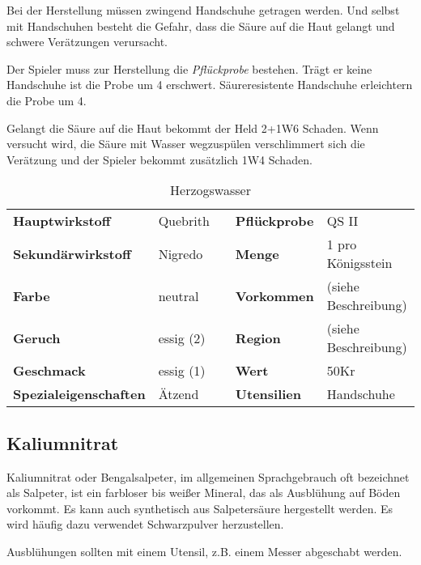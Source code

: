 Bei der Herstellung müssen zwingend Handschuhe getragen werden. Und selbst mit Handschuhen besteht die Gefahr, dass die Säure auf die Haut gelangt und schwere Verätzungen verursacht. 

Der Spieler muss zur Herstellung die \textit{Pflückprobe} bestehen. Trägt er keine Handschuhe ist die Probe um 4 erschwert. Säureresistente Handschuhe erleichtern die Probe um 4. 

Gelangt die Säure auf die Haut bekommt der Held 2+1W6 Schaden. Wenn versucht wird, die Säure mit Wasser wegzuspülen verschlimmert sich die Verätzung und der Spieler bekommt zusätzlich 1W4 Schaden.

\begin{table}[H] 
\begin{center} 
\begin{tabular}{|l|l|p{1cm}|l|l|} 
  	\cline{1-2} \cline{4-5} 
  	\textbf{Hauptwirkstoff} & Quebrith && \textbf{Pflückprobe} & QS II \\ \cline{1-2} \cline{4-5} 
  	\textbf{Sekundärwirkstoff} & Nigredo && \textbf{Menge} & 1 pro Königsstein \\ \cline{1-2} \cline{4-5} 
  	\textbf{Farbe} & neutral && \textbf{Vorkommen} & (siehe Beschreibung) \\ \cline{1-2} \cline{4-5} 
  	\textbf{Geruch} & essig (2) && \textbf{Region} & (siehe Beschreibung) \\ \cline{1-2} \cline{4-5} 
  	\textbf{Geschmack} & essig (1) && \textbf{Wert} & 50Kr \\ \cline{1-2} \cline{4-5} 
  	\textbf{Spezialeigenschaften} & Ätzend && \textbf{Utensilien} & Handschuhe \\ \cline{1-2} \cline{4-5} 
\end{tabular} 
\end{center} 
\caption{Herzogswasser} 
\label{tab:herzogswasser} 
\end{table}


\subsection{Kaliumnitrat}
\label{chap:kaliumnitrat}
Kaliumnitrat oder Bengalsalpeter, im allgemeinen Sprachgebrauch oft bezeichnet als Salpeter, ist ein farbloser bis weißer Mineral, das als Ausblühung auf Böden vorkommt. Es kann auch synthetisch aus Salpetersäure hergestellt werden. Es wird häufig dazu verwendet Schwarzpulver herzustellen. 

Ausblühungen sollten mit einem Utensil, z.B. einem Messer abgeschabt werden.

